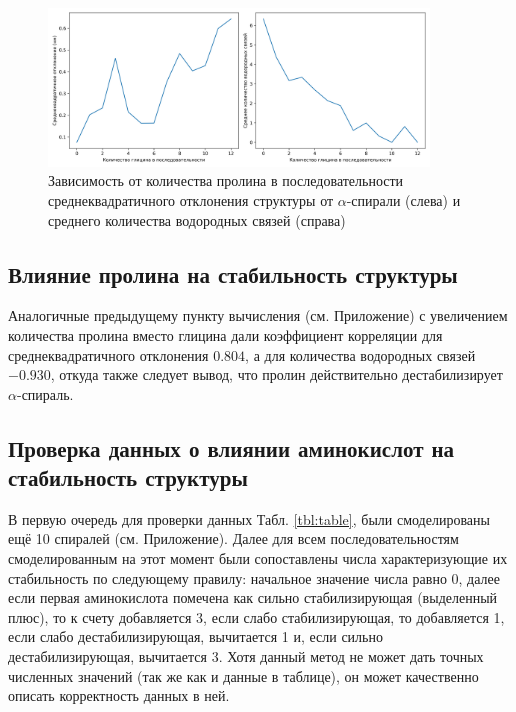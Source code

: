 \documentclass[
11pt,%
tightenlines,%
twoside,%
onecolumn,%
nofloats,%
nobibnotes,%
nofootinbib,%
superscriptaddress,%
noshowpacs,%
centertags]%
{revtex4}
\begin{document}
\begin{figure}[h!]
	\centering
	\includegraphics[width=0.9\textwidth]{pro}
	\caption{Зависимость от количества пролина в последовательности среднеквадратичного отклонения структуры от $\alpha$-спирали (слева) и среднего количества водородных связей (справа)}
\end{figure}

\subsection{Влияние пролина на стабильность структуры}
Аналогичные предыдущему пункту вычисления (см. Приложение) с увеличением количества пролина вместо глицина 
дали коэффициент корреляции для среднеквадратичного отклонения $0.804$, 
а для количества водородных связей $-0.930$, откуда также следует вывод, 
что пролин действительно дестабилизирует $\alpha$-спираль.



\subsection{Проверка данных о влиянии аминокислот на стабильность структуры}
В первую очередь для проверки данных Табл. \ref{tbl:table},
были смоделированы ещё 10 спиралей (см. Приложение). 
Далее для всем последовательностям смоделированным на этот момент были сопоставлены числа характеризующие их стабильность по следующему правилу: 
начальное значение числа равно 0, 
далее если первая аминокислота помечена как сильно стабилизирующая (выделенный плюс), 
то к счету добавляется 3, если слабо стабилизирующая, то добавляется 1,
если слабо дестабилизирующая, вычитается 1 и, если сильно дестабилизирующая, вычитается 3.
Хотя данный метод не может дать точных численных значений (так же как и данные в таблице), 
он может качественно описать корректность данных в ней. \par
\end{document}
